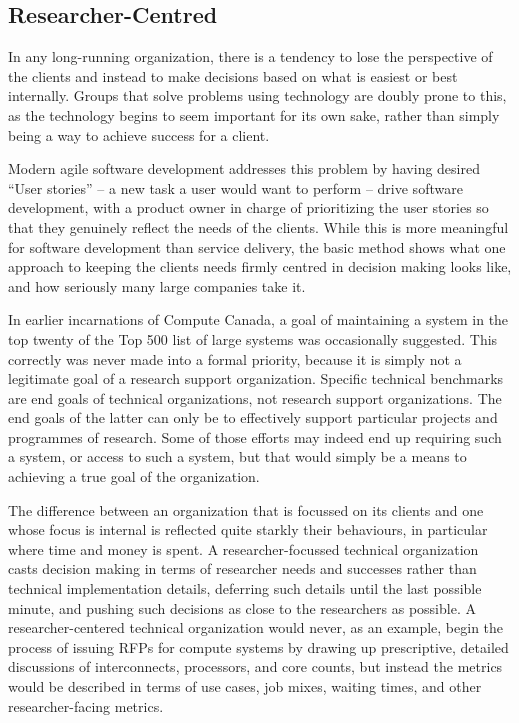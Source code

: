 \documentclass[11pt]{article}
\begin{document}
\subsection*{Researcher-Centred}

In any long-running organization, there is a tendency to lose the
perspective of the clients and instead to make decisions based on
what is easiest or best internally.  Groups that solve
problems using technology are doubly prone to this, as the technology
begins to seem important for its own sake, rather than simply being
a way to achieve success for a client.

Modern agile software development addresses this problem by having
desired \enquote{User stories} -- a new task a user would want to
perform -- drive software development, with a product owner in
charge of prioritizing the user stories so that they genuinely
reflect the needs of the clients.  While this is more meaningful
for software development than service delivery, the basic method
shows what one approach to keeping the clients needs firmly centred
in decision making looks like, and how seriously many large companies
take it.

In earlier incarnations of Compute Canada, a goal of maintaining a
system in the top twenty of the Top 500 list of large systems was
occasionally suggested.  This correctly was never made into a formal
priority, because it is simply not a legitimate goal of a research
support organization.  Specific technical benchmarks are end goals
of technical organizations, not research support organizations.
The end goals of the latter can only be to effectively support
particular projects and programmes of research.  Some of those
efforts may indeed end up requiring such a system, or access to
such a system, but that would simply be a means to achieving a true
goal of the organization.

The difference between an organization that is focussed on its
clients and one whose focus is internal is reflected quite starkly
their behaviours, in particular where time and money is spent.  A
researcher-focussed technical organization casts decision making
in terms of researcher needs and successes rather than technical
implementation details, deferring such details until the last
possible minute, and pushing such decisions as close to the researchers
as possible.  A researcher-centered technical organization would
never, as an example, begin the process of issuing RFPs for compute
systems by drawing up prescriptive, detailed discussions of
interconnects, processors, and core counts, but instead the metrics
would be described in terms of use cases, job mixes, waiting times,
and other researcher-facing metrics.
\end{document}
